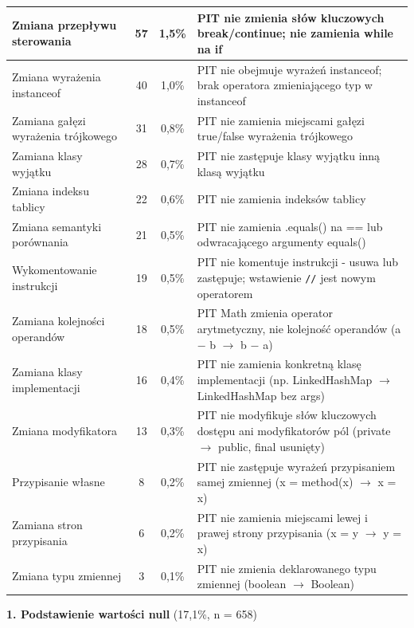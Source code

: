 \documentclass[12pt,a4paper,oldfontcommands]{memoir}
\theoremstyle{plain}
\theoremstyle{definition}
\theoremstyle{remark}
\begin{document}
\begin{footnotesize}
\begin{longtable}{|p{4.2cm}|c|c|p{7cm}|}
            Zmiana przepływu sterowania & 57 & 1,5\% & PIT nie zmienia słów kluczowych break/continue; nie zamienia while na if \\ \hline
            Zmiana wyrażenia instanceof & 40 & 1,0\% & PIT nie obejmuje wyrażeń instanceof; brak operatora zmieniającego typ w instanceof \\ \hline
            Zamiana gałęzi wyrażenia trójkowego & 31 & 0,8\% & PIT nie zamienia miejscami gałęzi true/false wyrażenia trójkowego \\ \hline
            Zamiana klasy wyjątku & 28 & 0,7\% & PIT nie zastępuje klasy wyjątku inną klasą wyjątku \\ \hline
            Zmiana indeksu tablicy & 22 & 0,6\% & PIT nie zamienia indeksów tablicy \\ \hline
            Zmiana semantyki porównania & 21 & 0,5\% & PIT nie zamienia .equals() na == lub odwracającego argumenty equals() \\ \hline
            Wykomentowanie instrukcji & 19 & 0,5\% & PIT nie komentuje instrukcji - usuwa lub zastępuje; wstawienie \texttt{//} jest nowym operatorem \\ \hline
            Zamiana kolejności operandów & 18 & 0,5\% & PIT Math zmienia operator arytmetyczny, nie kolejność operandów (a $-$ b $\rightarrow$ b $-$ a) \\ \hline
            Zamiana klasy implementacji & 16 & 0,4\% & PIT nie zamienia konkretną klasę implementacji (np. LinkedHashMap $\rightarrow$ LinkedHashMap bez args) \\ \hline
            Zmiana modyfikatora & 13 & 0,3\% & PIT nie modyfikuje słów kluczowych dostępu ani modyfikatorów pól (private $\rightarrow$ public, final usunięty) \\ \hline
            Przypisanie własne & 8 & 0,2\% & PIT nie zastępuje wyrażeń przypisaniem samej zmiennej (x = method(x) $\rightarrow$ x = x) \\ \hline
            Zamiana stron przypisania & 6 & 0,2\% & PIT nie zamienia miejscami lewej i prawej strony przypisania (x = y $\rightarrow$ y = x) \\ \hline
            Zmiana typu zmiennej & 3 & 0,1\% & PIT nie zmienia deklarowanego typu zmiennej (boolean $\rightarrow$ Boolean) \\ \hline
        \end{longtable}
    \end{footnotesize}

    \textbf{1. Podstawienie wartości null} (17,1\%, n = 658)
\end{document}
